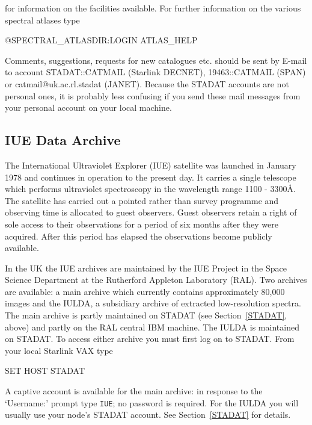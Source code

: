 \documentclass[twoside,11pt,nolof]{starlink}
\begin{document}
for information on the facilities available. For further information on
the various spectral atlases type

\begin{terminalv}
    @SPECTRAL_ATLASDIR:LOGIN
    ATLAS_HELP
\end{terminalv}

Comments, suggestions, requests for new catalogues etc. should be sent
by E-mail to account STADAT::CATMAIL (Starlink DECNET),
19463::CATMAIL (SPAN) or catmail@uk.ac.rl.stadat (JANET). Because
the STADAT accounts are not personal ones, it is probably less confusing
if you send these mail messages from your personal account on your
local machine.

\subsection{IUE Data Archive
\label{IUE}}

The International Ultraviolet Explorer (IUE) satellite was launched in
January 1978 and continues in operation to the present day. It
carries a single telescope which performs ultraviolet spectroscopy in
the wavelength range 1100 - 3300\AA. The satellite has carried out a
pointed rather than survey programme and observing time is allocated to
guest observers. Guest observers retain a right of sole access to their
observations for a period of six months after they were acquired. After
this period has elapsed the observations become publicly available.

In the UK the IUE archives are maintained by the IUE Project in the
Space Science Department at the Rutherford Appleton Laboratory (RAL).
Two archives are available: a main archive which currently contains
approximately 80,000 images and the IULDA, a subsidiary archive of
extracted low-resolution spectra. The main archive is partly maintained
on STADAT (see Section~\ref{STADAT}, above) and partly on the RAL
central IBM machine. The IULDA is maintained on STADAT. To access either
archive you must first log on to STADAT. From your local Starlink VAX
type

\begin{terminalv}
    SET  HOST  STADAT
\end{terminalv}

A captive account is available for the main archive: in response to the
`Username:' prompt type \verb-IUE-; no password is required. For the
IULDA you will usually use your node's STADAT account. See
Section~\ref{STADAT} for details.
\end{document}
